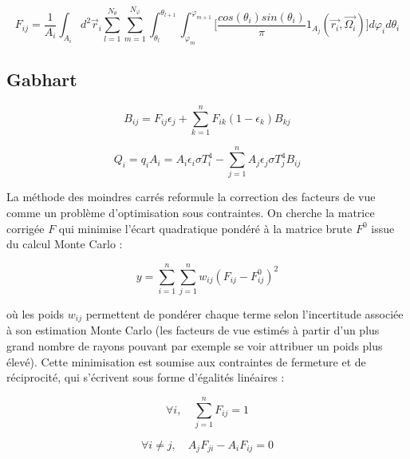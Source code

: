 \begin{equation}
    F_{ij} = \frac{1}{A_i} \int_{A_i} d^2\vec{r}_i \sum_{l = 1}^{N_{\theta}} \sum_{m = 1}^{N_{\varphi}} \int_{\theta_{l}}^{\theta_{l+1}} \int_{\varphi_{m}}^{\varphi_{m+1}} \bigg[\frac{cos(\theta_i) sin(\theta_i)}{\pi} 1_{A_j}(\vec{r_i}, \vec{\Omega_i})\bigg] d\varphi_i d\theta_i
\label{eq:MCfij}
\end{equation}




\subsection{Gabhart}
\begin{equation}
B_{ij} = F_{ij} \epsilon_j + \sum_{k=1}^n F_{ik} (1 - \epsilon_k) B_{kj}
\end{equation}


\begin{equation}
Q_i = q_i A_i = A_i \epsilon_i \sigma T_i^4 - \sum_{j=1}^nA_j\epsilon_j \sigma T_j^4 B_{ij}
\end{equation}


La méthode des moindres carrés reformule la correction des facteurs de vue comme un problème d'optimisation sous contraintes. On cherche la matrice corrigée $F$ qui minimise l'écart quadratique pondéré à la matrice brute $F^0$ issue du calcul Monte Carlo :

\begin{equation}
    y = \sum_{i=1}^{n} \sum_{j=1}^{n} w_{ij} \left(F_{ij} - F_{ij}^0\right)^2
    \label{eq:moindre_carre}
\end{equation}

où les poids $w_{ij}$ permettent de pondérer chaque terme selon l'incertitude associée à son estimation Monte Carlo (les facteurs de vue estimés à partir d'un plus grand nombre de rayons pouvant par exemple se voir attribuer un poids plus élevé). Cette minimisation est soumise aux contraintes de fermeture et de réciprocité, qui s'écrivent sous forme d'égalités linéaires :

\begin{equation}
    \forall i, \quad \sum_{j=1}^{n} F_{ij} = 1 
    \label{eq:contrainte_fermeture}
\end{equation}

\begin{equation}
    \forall i \neq j, \quad A_j F_{ji} - A_i F_{ij} = 0
    \label{eq:contrainte_reciprocite}
\end{equation}

